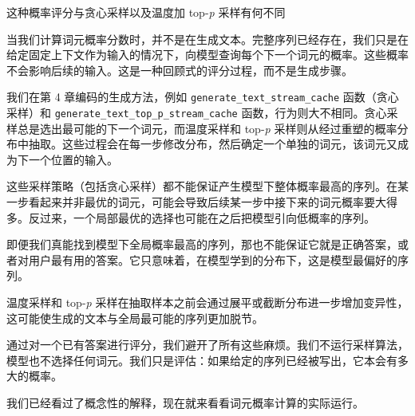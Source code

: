 \begin{mySidebar}{这种概率评分与贪心采样以及温度加 top-\emph{p} 采样有何不同}

当我们计算词元概率分数时，并不是在生成文本。完整序列已经存在，我们只是在给定固定上下文作为输入的情况下，向模型查询每个下一个词元的概率。这些概率不会影响后续的输入。这是一种回顾式的评分过程，而不是生成步骤。

我们在第 4 章编码的生成方法，例如 \texttt{generate\_text\_stream\_cache} 函数（贪心采样）和 \texttt{generate\_text\_top\_p\_stream\_cache} 函数，行为则大不相同。贪心采样总是选出最可能的下一个词元，而温度采样和 top-\emph{p} 采样则从经过重塑的概率分布中抽取。这些过程会在每一步修改分布，然后确定一个单独的词元，该词元又成为下一个位置的输入。

这些采样策略（包括贪心采样）都不能保证产生模型下整体概率最高的序列。在某一步看起来并非最优的词元，可能会导致后续某一步中接下来的词元概率要大得多。反过来，一个局部最优的选择也可能在之后把模型引向低概率的序列。

即便我们真能找到模型下全局概率最高的序列，那也不能保证它就是正确答案，或者对用户最有用的答案。它只意味着，在模型学到的分布下，这是模型最偏好的序列。

温度采样和 top-\emph{p} 采样在抽取样本之前会通过展平或截断分布进一步增加变异性，这可能使生成的文本与全局最可能的序列更加脱节。

通过对一个已有答案进行评分，我们避开了所有这些麻烦。我们不运行采样算法，模型也不选择任何词元。我们只是评估：如果给定的序列已经被写出，它本会有多大的概率。

\end{mySidebar}

我们已经看过了概念性的解释，现在就来看看词元概率计算的实际运行。

